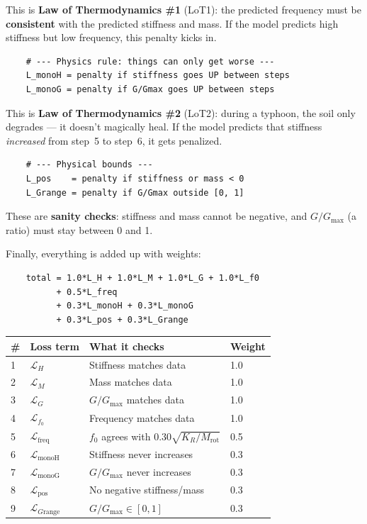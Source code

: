 \documentclass[11pt,a4paper]{article}
\begin{document}
This is \textbf{Law of Thermodynamics \#1} (LoT1): the predicted
frequency must be \textbf{consistent} with the predicted stiffness
and mass.  If the model predicts high stiffness but low frequency,
this penalty kicks in.

\begin{lstlisting}
    # --- Physics rule: things can only get worse ---
    L_monoH = penalty if stiffness goes UP between steps
    L_monoG = penalty if G/Gmax goes UP between steps
\end{lstlisting}

This is \textbf{Law of Thermodynamics \#2} (LoT2): during a typhoon,
the soil only degrades --- it doesn't magically heal.  If the model
predicts that stiffness \emph{increased} from step~5 to step~6,
it gets penalized.

\begin{lstlisting}
    # --- Physical bounds ---
    L_pos    = penalty if stiffness or mass < 0
    L_Grange = penalty if G/Gmax outside [0, 1]
\end{lstlisting}

These are \textbf{sanity checks}: stiffness and mass cannot be
negative, and $G/G_{\max}$ (a ratio) must stay between 0 and 1.

Finally, everything is added up with weights:

\begin{lstlisting}
    total = 1.0*L_H + 1.0*L_M + 1.0*L_G + 1.0*L_f0
          + 0.5*L_freq
          + 0.3*L_monoH + 0.3*L_monoG
          + 0.3*L_pos + 0.3*L_Grange
\end{lstlisting}

\begin{center}
\small
\begin{tabular}{llp{5.5cm}l}
\toprule
\textbf{\#} & \textbf{Loss term} & \textbf{What it checks} & \textbf{Weight} \\
\midrule
1 & $\mathcal{L}_H$    & Stiffness matches data     & 1.0 \\
2 & $\mathcal{L}_M$    & Mass matches data           & 1.0 \\
3 & $\mathcal{L}_G$    & $G/G_{\max}$ matches data   & 1.0 \\
4 & $\mathcal{L}_{f_0}$& Frequency matches data      & 1.0 \\
\midrule
5 & $\mathcal{L}_{\text{freq}}$ & $f_0$ agrees with
    $0.30\sqrt{K_R/M_{\text{rot}}}$ & 0.5 \\
6 & $\mathcal{L}_{\text{monoH}}$ & Stiffness never increases & 0.3 \\
7 & $\mathcal{L}_{\text{monoG}}$ & $G/G_{\max}$ never increases & 0.3 \\
8 & $\mathcal{L}_{\text{pos}}$ & No negative stiffness/mass & 0.3 \\
9 & $\mathcal{L}_{G\text{range}}$ & $G/G_{\max} \in [0,1]$ & 0.3 \\
\bottomrule
\end{tabular}
\end{center}
\end{document}
